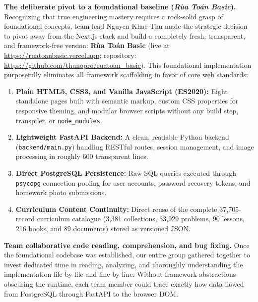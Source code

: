 \textbf{The deliberate pivot to a foundational baseline (\textit{Rùa Toán Basic}).}
Recognizing that true engineering mastery requires a rock-solid grasp of foundational concepts, team lead
Nguyen Khac Thu made the strategic decision to pivot away from the Next.js stack and build a completely
fresh, transparent, and framework-free version: \textbf{Rùa Toán Basic} (live at
\url{https://ruatoanbasic.vercel.app}; repository: \url{https://github.com/thunopro/ruatoan_basic}).
This foundational implementation purposefully eliminates all framework scaffolding in favor of core web standards:
\begin{enumerate}
  \item \textbf{Plain HTML5, CSS3, and Vanilla JavaScript (ES2020):} Eight standalone pages built with semantic
        markup, custom CSS properties for responsive theming, and modular browser scripts without any build step,
        transpiler, or \texttt{node\_modules}.
  \item \textbf{Lightweight FastAPI Backend:} A clean, readable Python backend (\texttt{backend/main.py}) handling
        RESTful routes, session management, and image processing in roughly 600 transparent lines.
  \item \textbf{Direct PostgreSQL Persistence:} Raw SQL queries executed through \texttt{psycopg} connection
        pooling for user accounts, password recovery tokens, and homework photo submissions.
  \item \textbf{Curriculum Content Continuity:} Direct reuse of the complete 37,705-record curriculum catalogue
        (3,381 collections, 33,929 problems, 90 lessons, 216 books, and 89 documents) stored as versioned JSON.
\end{enumerate}

\textbf{Team collaborative code reading, comprehension, and bug fixing.}
Once the foundational codebase was established, our entire group gathered together to invest dedicated time
in reading, analyzing, and thoroughly understanding the implementation file by file and line by line. Without
framework abstractions obscuring the runtime, each team member could trace exactly how data flowed from
PostgreSQL through FastAPI to the browser DOM.

